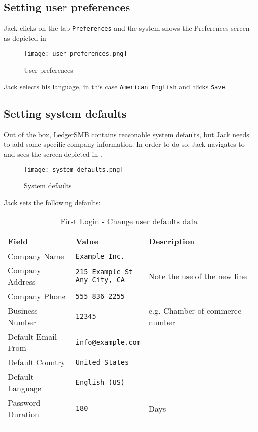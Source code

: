 \subsection{Setting user preferences}
\label{subsec-setting-user-preferences}

Jack clicks on the tab \texttt{Preferences} and the system shows the Preferences screen 
as depicted in 

\begin{figure}[H]
        \centering
        \texttt{[image: user-preferences.png]}
        \caption{User preferences}
        \label{fig:first-user-preferences}
\end{figure}

Jack selects his language, in this case \texttt{American English} and clicks \texttt{Save}.

\subsection{Setting system defaults}
\label{subsec-setting-system-defaults}

Out of the box, LedgerSMB contains reasonable system defaults, but Jack needs to add some specific company information.
In order to do so, Jack navigates to  and sees the screen depicted in .
 
\begin{figure}[H]
        \centering
        \texttt{[image: system-defaults.png]}
        \caption{System defaults}
        \label{fig:first-user-system-defaults}
\end{figure}

Jack sets the following defaults:
\begin{longtable}{ llp{6cm} }
        Field & Value & Description \\ \hline
        \endhead
        Company Name & \texttt{Example Inc.} & \\
        Company Address &  \makecell[l]{\texttt{215 Example St} \\  \texttt{Any City, CA}} & Note the use of the new line\\
        Company Phone &  \texttt{555 836 2255} & \\
        Business Number &  \texttt{12345} & e.g. Chamber of commerce number\\
        Default Email From & \texttt{info@example.com} & \\
        Default Country & \texttt{United States}  & \\
        Default Language &  \texttt{English (US)} & \\
        Password Duration &  \texttt{180} & Days\\
        \\
\caption{First Login - Change user defaults data}
\label{fig:first-user-user-default-data}
\end{longtable}

